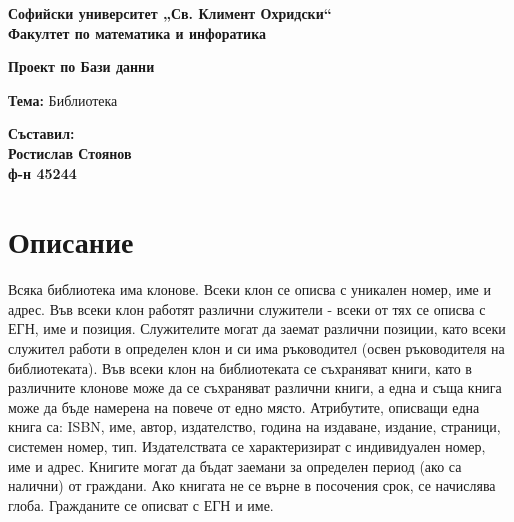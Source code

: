 \documentclass[11pt,a4paper]{article}
\begin{document}
\linespread{1.25}
\begin{titlepage}
   \begin{center}
       \vspace*{1cm}

\LARGE
       \textbf{Софийски университет „Св. Климент Охридски“\\
       Факултет по математика и инфоратика\\}

 

\addvspace{110pt}


	\Huge
       \textbf{Проект по Бази данни}

	
       \vspace{0.5cm}
	\LARGE
        \textbf{Тема:} Библиотека
 
       \vspace{1.5cm}
   \end{center}
    \vfill
\Large
       \textbf{Съставил:\\Ростислав Стоянов\\ф-н 45244}
 
    
 
 
       \vspace{0.8cm}
 


 

\end{titlepage}

\large
\tableofcontents
\pagebreak


\section{Описание}
Всяка библиотека има клонове. Всеки клон се описва с уникален номер, име и адрес. Във всеки клон работят различни служители - всеки от тях се описва с ЕГН, име и позиция. Служителите могат да заемат различни позиции, като всеки служител работи в определен клон и си има ръководител (освен ръководителя на библиотеката). Във всеки клон на библиотеката се съхраняват книги, като в различните клонове може да се съхраняват различни книги, а една и съща книга може да бъде намерена на повече от едно място. Атрибутите, описващи една книга са: ISBN, име, автор, издателство, година на издаване, издание, страници, системен номер, тип. Издателствата се характеризират с индивидуален номер, име и адрес. Книгите могат да бъдат заемани за определен период (ако са налични) от граждани. Ако книгата не се върне в посочения срок, се начислява глоба. Гражданите се описват с ЕГН и име.
\pagebreak
\end{document}
